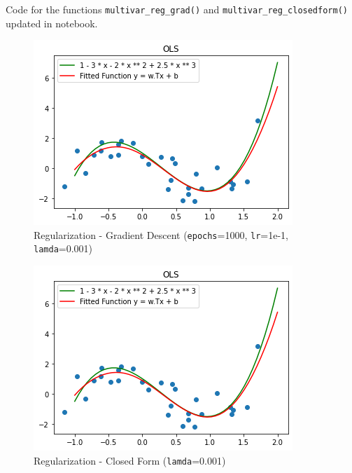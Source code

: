 \documentclass[12pt, fleqn]{article}
\begin{document}
\subsubsection{}
Code for the functions \verb!multivar_reg_grad()! and \verb!multivar_reg_closedform()! updated in notebook.
\begin{figure}[H]
  \centering
  \includegraphics[scale=0.7]{multivar_reg_grad.png}
  \caption{Regularization - Gradient Descent (\texttt{epochs}=1000, \texttt{lr}=1e-1, \texttt{lamda}=0.001)}
\end{figure}
\begin{figure}[H]
  \centering
  \includegraphics[scale=0.7]{multivar_reg_closedform.png}
  \caption{Regularization - Closed Form (\texttt{lamda}=0.001)}
\end{figure}
\end{document}
